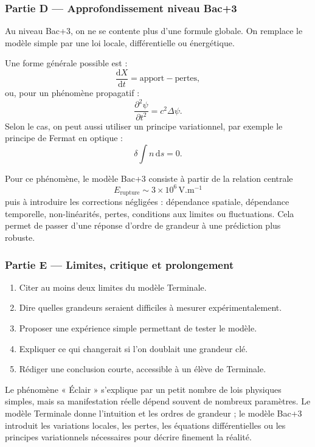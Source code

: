 \documentclass[11pt,a4paper]{article}
\begin{document}
\subsubsection*{Partie D — Approfondissement niveau Bac+3}

\begin{approfondissementbox}
Au niveau Bac+3, on ne se contente plus d'une formule globale. On remplace le modèle simple par une loi locale, différentielle ou énergétique.

Une forme générale possible est :
\[
\frac{\mathrm d X}{\mathrm dt}=\text{apport}-\text{pertes},
\]
ou, pour un phénomène propagatif :
\[
\frac{\partial^2 \psi}{\partial t^2}=c^2\Delta\psi.
\]
Selon le cas, on peut aussi utiliser un principe variationnel, par exemple le principe de Fermat en optique :
\[
\delta \int n\,\mathrm ds=0.
\]

Pour ce phénomène, le modèle Bac+3 consiste à partir de la relation centrale
\[
E_{\mathrm{rupture}}\sim 3\times10^6\,\mathrm{V.m^{-1}}
\]
puis à introduire les corrections négligées : dépendance spatiale, dépendance temporelle, non-linéarités, pertes, conditions aux limites ou fluctuations. Cela permet de passer d'une réponse d'ordre de grandeur à une prédiction plus robuste.
\end{approfondissementbox}

\subsubsection*{Partie E — Limites, critique et prolongement}

\begin{enumerate}
  \item Citer au moins deux limites du modèle Terminale.
  \item Dire quelles grandeurs seraient difficiles à mesurer expérimentalement.
  \item Proposer une expérience simple permettant de tester le modèle.
  \item Expliquer ce qui changerait si l'on doublait une grandeur clé.
  \item Rédiger une conclusion courte, accessible à un élève de Terminale.
\end{enumerate}

\begin{corrigebox}
Le phénomène « Éclair » s'explique par un petit nombre de lois physiques simples, mais sa manifestation réelle dépend souvent de nombreux paramètres. Le modèle Terminale donne l'intuition et les ordres de grandeur ; le modèle Bac+3 introduit les variations locales, les pertes, les équations différentielles ou les principes variationnels nécessaires pour décrire finement la réalité.
\end{corrigebox}
\end{document}
